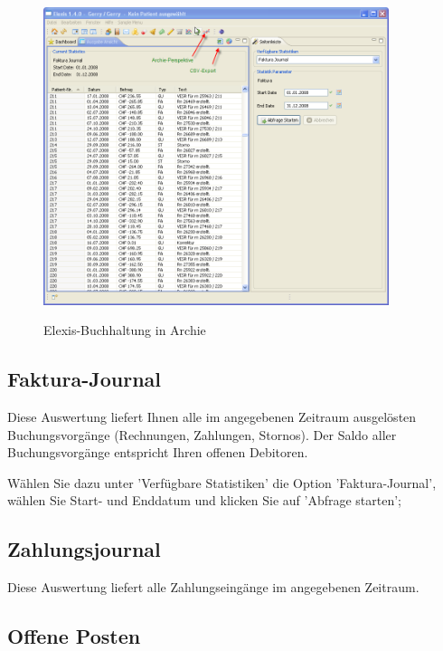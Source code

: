 \documentclass[a4paper]{scrartcl}
\begin{document}
\begin{figure}
  \includegraphics[width=0.9\textwidth]{buch1}\\
  \caption{Elexis-Buchhaltung in Archie}\label{fig:buch1}
\end{figure}

\subsection{Faktura-Journal}
Diese Auswertung liefert Ihnen alle im angegebenen Zeitraum ausgelösten Buchungsvorgänge (Rechnungen, Zahlungen, Stornos). Der Saldo aller Buchungsvorgänge entspricht Ihren offenen Debitoren.

Wählen Sie dazu unter 'Verfügbare Statistiken' die Option 'Faktura-Journal', wählen Sie Start- und Enddatum und klicken Sie auf 'Abfrage starten';

\subsection{Zahlungsjournal}
Diese Auswertung liefert alle Zahlungseingänge im angegebenen Zeitraum.

\subsection{Offene Posten}
\end{document}
